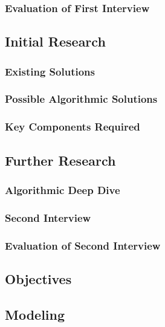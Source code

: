 \begin{flushleft}
            \subsubsection{Evaluation of First Interview}
            \lipsum[2]

        \bk

        \subsection{Initial Research} 
            \subsubsection{Existing Solutions}
            \lipsum[2]

            \subsubsection{Possible Algorithmic Solutions}
            \lipsum[2]

            \subsubsection{Key Components Required}
            \lipsum[2]

        \subsection{Further Research}
            \subsubsection{Algorithmic Deep Dive}
            \lipsum[2]

            \subsubsection{Second Interview}
            \lipsum[2]

            \subsubsection{Evaluation of Second Interview}
            \lipsum[2]

        \subsection{Objectives}
            \lipsum[2]

        \subsection{Modeling}
            \lipsum[2]

        \bk

\end{flushleft}